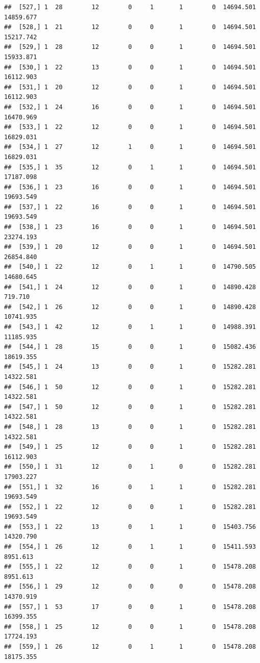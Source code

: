 \documentclass[
]{article}
\begin{document}
\begin{verbatim}
##  [527,] 1  28        12        0     1       1        0  14694.501  14859.677
##  [528,] 1  21        12        0     0       1        0  14694.501  15217.742
##  [529,] 1  28        12        0     0       1        0  14694.501  15933.871
##  [530,] 1  22        13        0     0       1        0  14694.501  16112.903
##  [531,] 1  20        12        0     0       1        0  14694.501  16112.903
##  [532,] 1  24        16        0     0       1        0  14694.501  16470.969
##  [533,] 1  22        12        0     0       1        0  14694.501  16829.031
##  [534,] 1  27        12        1     0       1        0  14694.501  16829.031
##  [535,] 1  35        12        0     1       1        0  14694.501  17187.098
##  [536,] 1  23        16        0     0       1        0  14694.501  19693.549
##  [537,] 1  22        16        0     0       1        0  14694.501  19693.549
##  [538,] 1  23        16        0     0       1        0  14694.501  23274.193
##  [539,] 1  20        12        0     0       1        0  14694.501  26854.840
##  [540,] 1  22        12        0     1       1        0  14790.505  14680.645
##  [541,] 1  24        12        0     0       1        0  14890.428    719.710
##  [542,] 1  26        12        0     0       1        0  14890.428  10741.935
##  [543,] 1  42        12        0     1       1        0  14988.391  11185.935
##  [544,] 1  28        15        0     0       1        0  15082.436  18619.355
##  [545,] 1  24        13        0     0       1        0  15282.281  14322.581
##  [546,] 1  50        12        0     0       1        0  15282.281  14322.581
##  [547,] 1  50        12        0     0       1        0  15282.281  14322.581
##  [548,] 1  28        13        0     0       1        0  15282.281  14322.581
##  [549,] 1  25        12        0     0       1        0  15282.281  16112.903
##  [550,] 1  31        12        0     1       0        0  15282.281  17903.227
##  [551,] 1  32        16        0     1       1        0  15282.281  19693.549
##  [552,] 1  22        12        0     0       1        0  15282.281  19693.549
##  [553,] 1  22        13        0     1       1        0  15403.756  14320.790
##  [554,] 1  26        12        0     1       1        0  15411.593   8951.613
##  [555,] 1  22        12        0     0       1        0  15478.208   8951.613
##  [556,] 1  29        12        0     0       0        0  15478.208  14370.919
##  [557,] 1  53        17        0     0       1        0  15478.208  16399.355
##  [558,] 1  25        12        0     0       1        0  15478.208  17724.193
##  [559,] 1  26        12        0     1       1        0  15478.208  18175.355

\end{verbatim}
\end{document}
